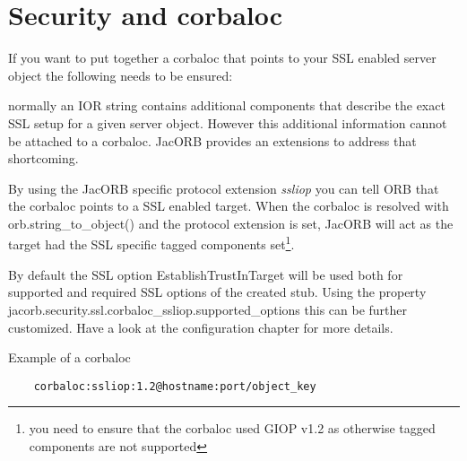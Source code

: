 \section{Security and corbaloc}

If you want to put together a corbaloc that points to your SSL enabled server object the following
needs to be ensured:

normally an IOR string contains additional components that describe the exact SSL setup for a given
server object. However this additional information cannot be attached to a corbaloc.
JacORB provides an extensions to address that shortcoming.

By using the JacORB specific protocol extension \emph{ssliop} you can tell ORB that the corbaloc points
to a SSL enabled target. When the corbaloc is resolved with orb.string\_to\_object() and the protocol extension is set,
JacORB will act as the target had the SSL specific tagged components
set\footnote{you need to ensure that the corbaloc used GIOP v1.2 as otherwise tagged components are not supported}.

By default the SSL option EstablishTrustInTarget
will be used both for supported and required SSL options of the created stub.
Using the property jacorb.security.ssl.corbaloc\_ssliop.supported\_options this can be further customized. Have a look at
the configuration chapter for more details.

Example of a corbaloc
\small{
\begin{verbatim}
    corbaloc:ssliop:1.2@hostname:port/object_key
\end{verbatim}
}

